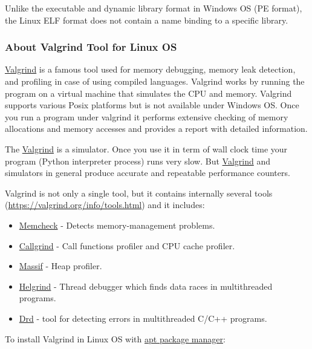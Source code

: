 \documentclass[
]{article}
\begin{document}
Unlike the executable and dynamic library format in Windows OS (PE
format), the Linux ELF format does not contain a name binding to a
specific library.

\hypertarget{about-valgrind-tool-for-linux-os}{%
\subsubsection{About Valgrind Tool for Linux
OS}\label{about-valgrind-tool-for-linux-os}}

\href{https://valgrind.org/}{Valgrind} is a famous tool used for memory
debugging, memory leak detection, and profiling in case of using
compiled languages. Valgrind works by running the program on a virtual
machine that simulates the CPU and memory. Valgrind supports various
Posix platforms but is not available under Windows OS. Once you run a
program under valgrind it performs extensive checking of memory
allocations and memory accesses and provides a report with detailed
information.

The \href{https://valgrind.org/}{Valgrind} is a simulator. Once you use
it in term of wall clock time your program (Python interpreter process)
runs very slow. But \href{https://valgrind.org/}{Valgrind} and
simulators in general produce accurate and repeatable performance
counters.

Valgrind is not only a single tool, but it contains internally several
tools (\url{https://valgrind.org/info/tools.html}) and it includes:

\begin{itemize}
\item
  \href{https://valgrind.org/docs/manual/mc-manual.html}{Memcheck} -
  Detects memory-management problems.
\item
  \href{https://valgrind.org/docs/manual/cl-manual.html}{Callgrind} -
  Call functions profiler and CPU cache profiler.
\item
  \href{https://valgrind.org/docs/manual/ms-manual.html}{Massif} - Heap
  profiler.
\item
  \href{https://valgrind.org/docs/manual/hg-manual.html}{Helgrind} -
  Thread debugger which finds data races in multithreaded programs.
\item
  \href{https://valgrind.org/docs/manual/drd-manual.html\#drd-manual.using-drd\%0A}{Drd}
  - tool for detecting errors in multithreaded C/C++ programs.
\end{itemize}

To install Valgrind in Linux OS with
\href{https://help.ubuntu.com/community/AptGet/Howto}{apt package
manager}:
\end{document}
